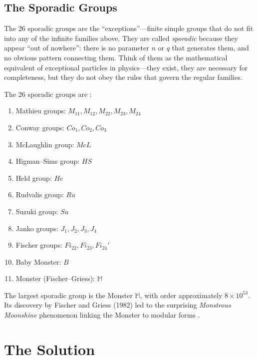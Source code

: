 \subsection{The Sporadic Groups}

The 26 sporadic groups are the ``exceptions''---finite simple groups that do not fit into any of the infinite families above. They are called \emph{sporadic} because they appear ``out of nowhere'': there is no parameter $n$ or $q$ that generates them, and no obvious pattern connecting them. Think of them as the mathematical equivalent of exceptional particles in physics---they exist, they are necessary for completeness, but they do not obey the rules that govern the regular families.

The 26 sporadic groups are \cite{conway1985}:

\begin{enumerate}
\item Mathieu groups: $M_{11}, M_{12}, M_{22}, M_{23}, M_{24}$
\item Conway groups: $Co_1, Co_2, Co_3$
\item McLaughlin group: $McL$
\item Higman--Sims group: $HS$
\item Held group: $He$
\item Rudvalis group: $Ru$
\item Suzuki group: $Su$
\item Janko groups: $J_1, J_2, J_3, J_4$
\item Fischer groups: $Fi_{22}, Fi_{23}, Fi_{24}'$
\item Baby Monster: $B$
\item Monster (Fischer--Griess): $\mathbb{M}$
\end{enumerate}

The largest sporadic group is the Monster $\mathbb{M}$, with order approximately $8 \times 10^{53}$. Its discovery by Fischer and Griess (1982) led to the surprising \emph{Monstrous Moonshine} phenomenon linking the Monster to modular forms \cite{conway1979}.

\section{The Solution}

